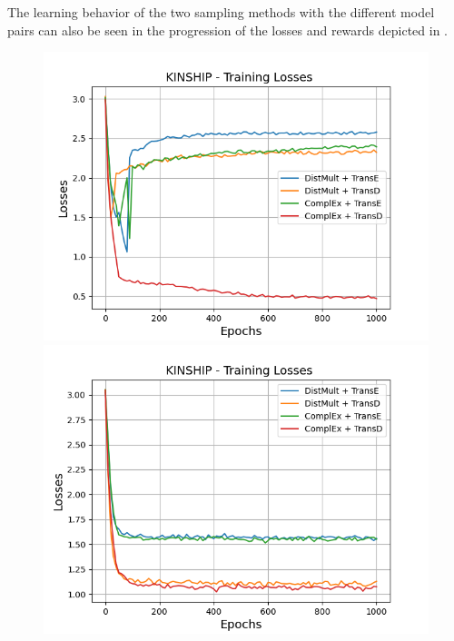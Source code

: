 The learning behavior of the two sampling methods with the different model pairs can also be seen in the progression of the losses and rewards depicted in .
\begin{figure}[H]
    \centering
    \begin{minipage}{.5\textwidth}
      \centering
      \includegraphics[width=0.9\linewidth]{figures/results/gan_train/not_pretrained/uncertainty/max/entropy/kinship/1k_epochs/uncertainty_kinship_losses.png}
    \end{minipage}%
    \begin{minipage}{.5\textwidth}
      \centering
      \includegraphics[width=0.9\linewidth]{figures/results/gan_train/not_pretrained/uncertainty/max_distribution/entropy/kinship/1k_epochs/uncertainty_kinship_losses.png}
    \end{minipage}

\end{figure}
